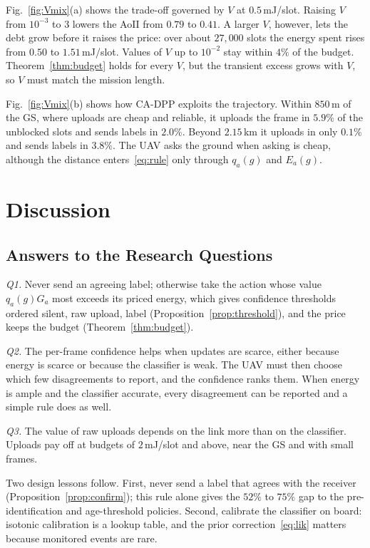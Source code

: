 \documentclass[journal]{IEEEtran}
\theoremstyle{remark}
\begin{document}
Fig.~\ref{fig:Vmix}(a) shows the trade-off governed by $V$ at $0.5$\,mJ/slot. Raising $V$ from $10^{-3}$ to $3$ lowers the AoII from $0.79$ to $0.41$. A larger $V$, however, lets the debt grow before it raises the price: over about $27{,}000$ slots the energy spent rises from $0.50$ to $1.51$\,mJ/slot. Values of $V$ up to $10^{-2}$ stay within $4\%$ of the budget. Theorem~\ref{thm:budget} holds for every $V$, but the transient excess grows with $V$, so $V$ must match the mission length.

Fig.~\ref{fig:Vmix}(b) shows how CA-DPP exploits the trajectory. Within $850$\,m of the GS, where uploads are cheap and reliable, it uploads the frame in $5.9\%$ of the unblocked slots and sends labels in $2.0\%$. Beyond $2.15$\,km it uploads in only $0.1\%$ and sends labels in $3.8\%$. The UAV asks the ground when asking is cheap, although the distance enters~\eqref{eq:rule} only through $q_a(g)$ and $E_a(g)$.
\section{Discussion}\label{sec:discussion}
\subsection{Answers to the Research Questions}
\emph{Q1.} Never send an agreeing label; otherwise take the action whose value $q_a(g)G_a$ most exceeds its priced energy, which gives confidence thresholds ordered silent, raw upload, label (Proposition~\ref{prop:threshold}), and the price keeps the budget (Theorem~\ref{thm:budget}).

\emph{Q2.} The per-frame confidence helps when updates are scarce, either because energy is scarce or because the classifier is weak. The UAV must then choose which few disagreements to report, and the confidence ranks them. When energy is ample and the classifier accurate, every disagreement can be reported and a simple rule does as well.

\emph{Q3.} The value of raw uploads depends on the link more than on the classifier. Uploads pay off at budgets of $2$\,mJ/slot and above, near the GS and with small frames.

Two design lessons follow. First, never send a label that agrees with the receiver (Proposition~\ref{prop:confirm}); this rule alone gives the $52\%$ to $75\%$ gap to the pre-identification and age-threshold policies. Second, calibrate the classifier on board: isotonic calibration is a lookup table, and the prior correction~\eqref{eq:lik} matters because monitored events are rare.
\end{document}
